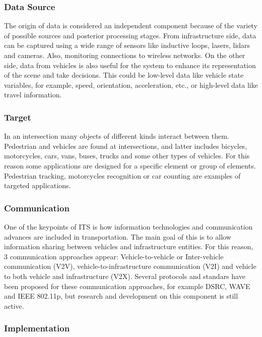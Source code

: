 \documentclass[conference]{IEEEtran}
\begin{document}
\subsubsection{Data Source}

The origin of data is considered an independent component because of the variety of possible sources and posterior processing stages. From infrastructure side, data can be captured using a wide range of sensors like inductive loops, lasers, lidars and cameras. Also, monitoring connections to wireless networks. On the other side, data from vehicles is also useful for the system to enhance its representation of the scene and take decisions. This could be low-level data like vehicle state variables, for example, speed, orientation, acceleration, etc., or high-level data like travel information.


\subsubsection{Target}

In an intersection many objects of different kinds interact between them. Pedestrian and vehicles are found at intersections, and latter includes bicycles, motorcycles, cars, vans, buses, trucks and some other types of vehicles. For this reason some applications are designed for a specific element or group of elements. Pedestrian tracking, motorcycles recognition or car counting are examples of targeted applications.

\subsubsection{Communication}

One of the keypoints of ITS is how information technologies and communication advances are included in transportation. The main goal of this is to allow information sharing between vehicles and infrastructure entities. For this reason, 3 communication approaches appear: Vehicle-to-vehicle or Inter-vehicle communication (V2V), vehicle-to-infrastructure communication (V2I) and vehicle to both vehicle and infrastructure (V2X). Several protocols and standars have been proposed for these communication approaches, for example DSRC, WAVE and IEEE 802.11p, but research and development on this component is still active.

\subsubsection{Implementation}
\end{document}
